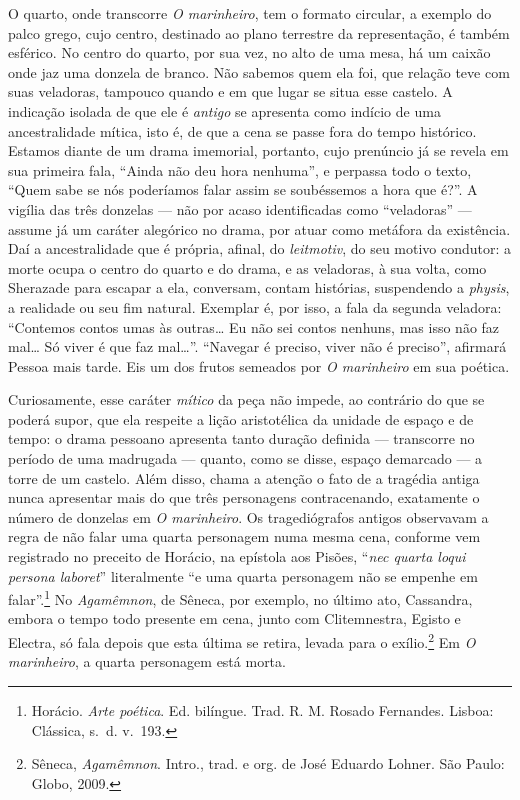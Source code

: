 O quarto, onde transcorre \textit{O marinheiro}, tem o formato circular, a exemplo do palco grego,
cujo centro, destinado ao plano terrestre da representação,
é também esférico. No centro do quarto, por sua vez, no alto
de uma mesa, há um caixão onde jaz uma donzela de branco.
Não sabemos quem ela foi, que relação teve
com suas veladoras, tampouco quando e em que lugar se situa esse
castelo. A indicação isolada de que ele
é \textit{antigo} se apresenta
como indício de uma ancestralidade mítica, isto é, de que a cena se
passe fora do tempo histórico. Estamos diante de um 
drama imemorial,
portanto, cujo prenúncio já se revela em sua primeira 
fala, “Ainda não
deu hora nenhuma”, e perpassa todo o texto, “Quem sabe se nós
poderíamos falar assim se soubéssemos a hora que é?”.
A vigília das três
donzelas --- não por acaso identificadas como “veladoras” ---
assume já um caráter alegórico no drama, por atuar como 
metáfora da existência. Daí
a ancestralidade que é própria, afinal, do
\textit{leitmotiv}, do seu motivo condutor:
a morte ocupa o centro do quarto e do drama, e as
veladoras, à sua volta, como Sherazade para escapar a ela,
conversam,
contam histórias, suspendendo a \textit{physis},
a realidade ou seu fim natural. 
Exemplar é, por isso, a fala da segunda veladora: “Contemos
contos umas às outras\ldots{} Eu não sei contos nenhuns, 
mas isso não faz mal\ldots{} Só viver é que faz mal\ldots{}”. 
``Navegar é preciso, viver não é
preciso'', afirmará Pessoa mais tarde. Eis um dos 
frutos semeados por \textit{O marinheiro} em sua poética.

Curiosamente, esse caráter \textit{mítico} da peça não impede, ao
contrário do que se poderá supor, que ela respeite a lição 
aristotélica da unidade de espaço e de tempo: 
o drama pessoano apresenta tanto
duração definida --- transcorre no período de
uma madrugada --- quanto, como se disse, espaço
demarcado --- a torre de um castelo. Além disso,
chama a atenção o fato de a tragédia antiga 
nunca apresentar mais do
que três personagens contracenando, exatamente 
o número de donzelas em
\textit{O marinheiro}. Os tragediógrafos antigos 
observavam a regra de
não falar uma quarta personagem numa mesma cena, conforme vem
registrado no preceito de Horácio, na epístola aos Pisões,
``\textit{nec quarta loqui persona laboret}'' literalmente 
``e uma quarta personagem não se empenhe em
falar''.\footnote{ Horácio. \textit{Arte poética}. Ed.
bilíngue. Trad.  R. M. Rosado Fernandes. Lisboa: Clássica, s.~d.
v.~193.} No \textit{Agamêmnon},
de Sêneca, por exemplo, no último ato,
Cassandra, embora o tempo todo presente em cena, junto com
Clitemnestra, Egisto e Electra, só fala depois que esta última se
retira, levada para o exílio.\footnote{ Sêneca,
\textit{Agamêmnon}.
Intro., trad. e org. de José Eduardo Lohner.
São Paulo: Globo,
2009.} Em \textit{O marinheiro}, a quarta personagem está morta. 

